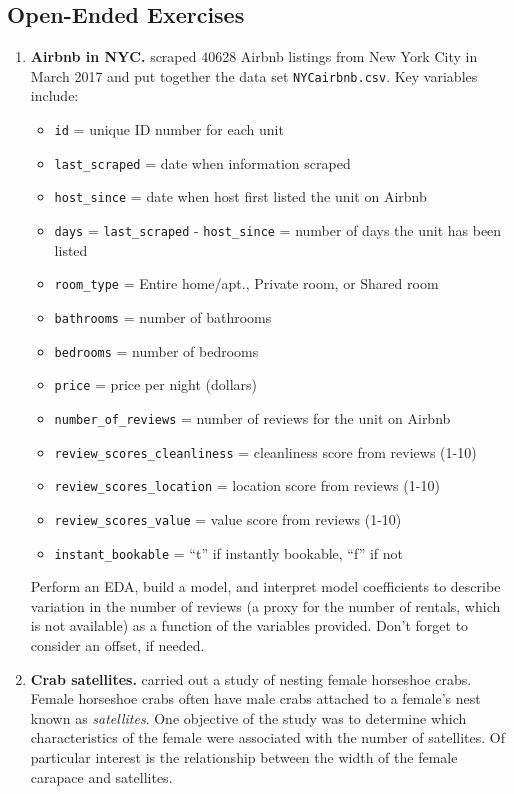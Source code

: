 \documentclass[
]{krantz}
\providecommand{\tightlist}{%
  \setlength{\itemsep}{0pt}\setlength{\parskip}{0pt}}
\begin{document}
\subsection{Open-Ended Exercises}\label{open-ended-exercises-2}

\begin{enumerate}
\def\labelenumi{\arabic{enumi}.}
\item
  \textbf{Airbnb in NYC.} \citet{Awad2017} scraped 40628 Airbnb listings from New York City in March 2017 and put together the data set \texttt{NYCairbnb.csv}. Key variables include:

  \begin{itemize}
  \tightlist
  \item
    \texttt{id} = unique ID number for each unit
  \item
    \texttt{last\_scraped} = date when information scraped
  \item
    \texttt{host\_since} = date when host first listed the unit on Airbnb
  \item
    \texttt{days} = \texttt{last\_scraped} - \texttt{host\_since} = number of days the unit has been listed
  \item
    \texttt{room\_type} = Entire home/apt., Private room, or Shared room
  \item
    \texttt{bathrooms} = number of bathrooms
  \item
    \texttt{bedrooms} = number of bedrooms
  \item
    \texttt{price} = price per night (dollars)
  \item
    \texttt{number\_of\_reviews} = number of reviews for the unit on Airbnb
  \item
    \texttt{review\_scores\_cleanliness} = cleanliness score from reviews (1-10)
  \item
    \texttt{review\_scores\_location} = location score from reviews (1-10)
  \item
    \texttt{review\_scores\_value} = value score from reviews (1-10)
  \item
    \texttt{instant\_bookable} = ``t'' if instantly bookable, ``f'' if not
  \end{itemize}

  Perform an EDA, build a model, and interpret model coefficients to describe variation in the number of reviews (a proxy for the number of rentals, which is not available) as a function of the variables provided. Don't forget to consider an offset, if needed.
\item
  \textbf{Crab satellites.} \citet{Brockmann1996} carried out a study of nesting female horseshoe crabs. Female horseshoe crabs often have male crabs attached to a female's nest known as \emph{satellites}. One objective of the study was to determine which characteristics of the female were associated with the number of satellites. Of particular interest is the relationship between the width of the female carapace and satellites.


\end{enumerate}
\end{document}
